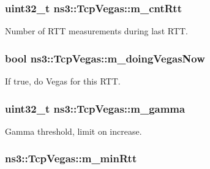 \subsubsection[{\texorpdfstring{m\+\_\+cnt\+Rtt}{m_cntRtt}}]{\setlength{\rightskip}{0pt plus 5cm}uint32\+\_\+t ns3\+::\+Tcp\+Vegas\+::m\+\_\+cnt\+Rtt\hspace{0.3cm}{\ttfamily [private]}}\hypertarget{classns3_1_1TcpVegas_a4149c239657ba2ea7399374ec0fd9682}{}\label{classns3_1_1TcpVegas_a4149c239657ba2ea7399374ec0fd9682}


Number of R\+TT measurements during last R\+TT. 

\subsubsection[{\texorpdfstring{m\+\_\+doing\+Vegas\+Now}{m_doingVegasNow}}]{\setlength{\rightskip}{0pt plus 5cm}bool ns3\+::\+Tcp\+Vegas\+::m\+\_\+doing\+Vegas\+Now\hspace{0.3cm}{\ttfamily [private]}}\hypertarget{classns3_1_1TcpVegas_a8207740cdef670e55f31d067baf10c06}{}\label{classns3_1_1TcpVegas_a8207740cdef670e55f31d067baf10c06}


If true, do Vegas for this R\+TT. 

\subsubsection[{\texorpdfstring{m\+\_\+gamma}{m_gamma}}]{\setlength{\rightskip}{0pt plus 5cm}uint32\+\_\+t ns3\+::\+Tcp\+Vegas\+::m\+\_\+gamma\hspace{0.3cm}{\ttfamily [private]}}\hypertarget{classns3_1_1TcpVegas_ae3ea97171ce6954d2b607f6bc8b9239c}{}\label{classns3_1_1TcpVegas_ae3ea97171ce6954d2b607f6bc8b9239c}


Gamma threshold, limit on increase. 

\subsubsection[{\texorpdfstring{m\+\_\+min\+Rtt}{m_minRtt}}]{ ns3\+::\+Tcp\+Vegas\+::m\+\_\+min\+Rtt\hspace{0.3cm}{\ttfamily [private]}}\hypertarget{classns3_1_1TcpVegas_aba6a10d787820b6907313b79cc16582c}{}\label{classns3_1_1TcpVegas_aba6a10d787820b6907313b79cc16582c}


